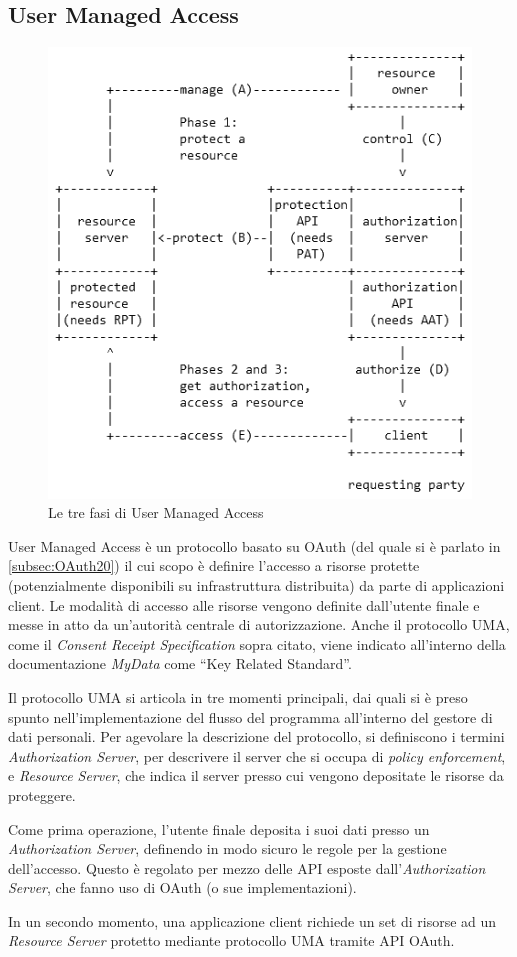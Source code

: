 \subsection{User Managed Access}
\begin{figure} [h]
	\centering
	\includegraphics[width=0.5\linewidth]{pictures/UMAPhases.png}
	\caption{Le tre fasi di User Managed Access}
	\label{fig:UMAPhases}
\end{figure}
User Managed Access \cite{uma} \`e un protocollo basato su OAuth (del quale si \`e parlato in \ref{subsec:OAuth20}) il cui scopo \`e definire l’accesso a risorse protette (potenzialmente disponibili su infrastruttura distribuita) da parte di applicazioni client. Le modalit\`a di accesso alle risorse vengono definite dall’utente finale e messe in atto da un’autorit\`a centrale di autorizzazione. Anche il protocollo UMA, come il \textit{Consent Receipt Specification} sopra citato, viene indicato all’interno della documentazione \textit{MyData} come “Key Related Standard”.

Il protocollo UMA si articola in tre momenti principali, dai quali si \`e preso spunto nell’implementazione del flusso del programma all’interno del gestore di dati personali. Per agevolare la descrizione del protocollo, si definiscono i termini \textit{Authorization Server}, per descrivere il server che si occupa di \textit{policy enforcement}, e \textit{Resource Server}, che indica il server presso cui vengono depositate le risorse da proteggere.

Come prima operazione, l’utente finale deposita i suoi dati presso un \textit{Authorization Server}, definendo in modo sicuro le regole per la gestione dell’accesso. Questo \`e regolato per mezzo delle API esposte dall’\textit{Authorization Server}, che fanno uso di OAuth (o sue implementazioni).

In un secondo momento, una applicazione client richiede un set di risorse ad un \textit{Resource Server} protetto mediante protocollo UMA tramite API OAuth. 

